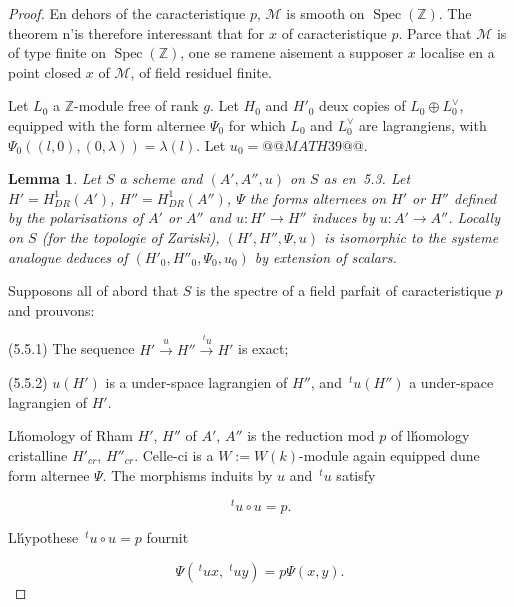 \documentclass[11pt,a4paper]{article}
\theoremstyle{plain}
\newtheorem{lemma}[theorem]{Lemma}
\theoremstyle{definition}
\DeclareMathOperator{\Spec}{Spec}
\begin{document}
\begin{proof}
En dehors of the caracteristique $p$, $\mathscr{M}$ is smooth on $\Spec(\mathbb{Z})$. The theorem n'is
therefore interessant that for $x$ of caracteristique $p$. Parce that $\mathscr{M}$ is of type finite
on $\Spec(\mathbb{Z})$, one se ramene aisement a supposer $x$ localise en a point closed $x$
of $\mathscr{M}$, of field residuel finite.

Let $L_0$ a $\mathbb{Z}$-module free of rank $g$. Let $H_0$ and $H'_0$ deux copies of
$L_0 \oplus L_0^\vee$, equipped with the form alternee $\Psi_0$ for which $L_0$ and $L_0^\vee$ are lagrangiens,
with $\Psi_0((l,0), (0, \lambda)) = \lambda(l)$. Let $u_0 = @@MATH39@@$.

\begin{lemma}
Let $S$ a scheme and $(A', A'', u)$ on $S$ as en~5.3. Let
$H' = H^1_{DR}(A')$, $H'' = H^1_{DR}(A'')$, $\Psi$ the forms alternees on $H'$ or $H''$ defined by
the polarisations of $A'$ or $A''$ and $u: H' \to H''$ induces by $u: A' \to A''$. Locally on
$S$ (for the topologie of Zariski), $(H', H'', \Psi, u)$ is isomorphic to the systeme analogue
deduces of $(H'_0, H''_0, \Psi_0, u_0)$ by extension of scalars.
\end{lemma}

Supposons all of abord that $S$ is the spectre of a field parfait of
caracteristique $p$ and prouvons:

(5.5.1) The sequence $H' \xrightarrow{u} H'' \xrightarrow{\,\!^t u} H'$ is exact;

(5.5.2) $u(H')$ is a under-space lagrangien of $H''$,
and $\,\!^t u(H'')$ a under-space lagrangien of $H'$.

L\'homology of Rham $H'$, $H''$ of $A'$, $A''$ is the reduction mod $p$ of
l\'homology cristalline $H'_{cr}$, $H''_{cr}$. Celle-ci is a $W := W(k)$-module again equipped
dune form alternee $\Psi$. The morphisms induits by $u$ and $\,\!^t u$ satisfy

\begin{equation}
\,\!^t u \circ u = p.
\end{equation}

L\'hypothese $\,\!^t u \circ u = p$ fournit

\begin{equation}
\Psi(\,\!^t u x, \; \!^t u y) = p \Psi(x, y).
\end{equation}


\end{proof}
\end{document}
